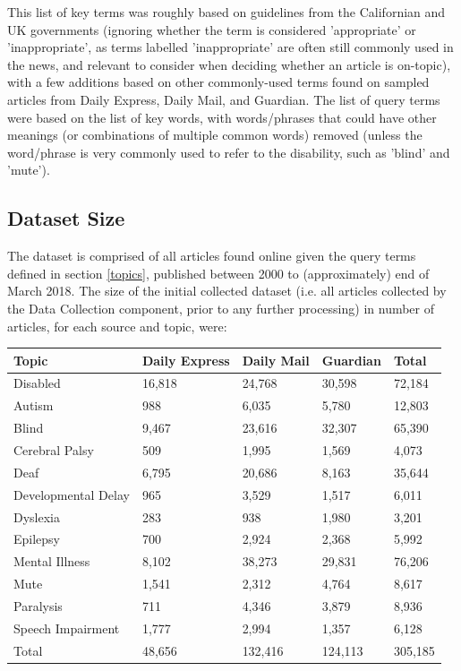 \documentclass{report}
\begin{document}
This list of key terms was roughly based on guidelines from the Californian \cite{ca-guideline} and UK \cite{uk-guideline} governments (ignoring whether the term is considered 'appropriate' or 'inappropriate', as terms labelled 'inappropriate' are often still commonly used in the news, and relevant to consider when deciding whether an article is on-topic), with a few additions based on other commonly-used terms found on sampled articles from Daily Express, Daily Mail, and Guardian.
The list of query terms were based on the list of key words, with words/phrases that could have other meanings (or combinations of multiple common words) removed (unless the word/phrase is very commonly used to refer to the disability, such as 'blind' and 'mute').

\subsection{Dataset Size} \label{dataset-size}

The dataset is comprised of all articles found online given the query terms defined in section \ref{topics}, published between 2000 to (approximately) end of March 2018.
The size of the initial collected dataset (i.e. all articles collected by the Data Collection component, prior to any further processing) in number of articles, for each source and topic, were:

\begin{center}
	\begin{tabu} to 1.0\textwidth { | X[c] | X[c] | X[c] | X[c] | X[c] | }
		\hline
		Topic & Daily Express & Daily Mail & Guardian & Total \\
		\hline
		Disabled & 16,818 & 24,768 & 30,598 & 72,184  \\
		\hline
		Autism & 988 & 6,035 & 5,780 & 12,803  \\
		\hline
		Blind & 9,467 & 23,616 & 32,307 & 65,390  \\
		\hline
		Cerebral Palsy & 509 & 1,995 & 1,569 & 4,073  \\
		\hline
		Deaf & 6,795 & 20,686 & 8,163 & 35,644  \\
		\hline
		Developmental Delay & 965 & 3,529 & 1,517 & 6,011  \\
		\hline
		Dyslexia & 283 & 938 & 1,980 & 3,201  \\
		\hline
		Epilepsy & 700 & 2,924 & 2,368 & 5,992  \\
		\hline
		Mental Illness & 8,102 & 38,273 & 29,831 & 76,206  \\
		\hline
		Mute & 1,541 & 2,312 & 4,764 & 8,617  \\
		\hline
		Paralysis & 711 & 4,346 & 3,879 & 8,936  \\
		\hline
		Speech Impairment & 1,777 & 2,994 & 1,357 & 6,128  \\
		\hline
		Total & 48,656 & 132,416 & 124,113 & 305,185  \\
		\hline
	\end{tabu}
\end{center}
\end{document}
